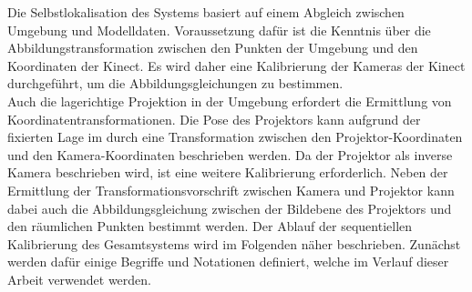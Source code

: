 Die Selbstlokalisation des Systems basiert auf einem Abgleich zwischen Umgebung und Modelldaten. Voraussetzung dafür ist die Kenntnis über die Abbildungstransformation zwischen den Punkten der Umgebung und den Koordinaten der Kinect. Es wird daher eine Kalibrierung der Kameras der Kinect durchgeführt, um die Abbildungsgleichungen zu bestimmen.\\

Auch die lagerichtige Projektion in der Umgebung erfordert die Ermittlung von Koordinatentransformationen. Die Pose des Projektors kann aufgrund der fixierten Lage im \kps{} durch eine Transformation zwischen den Projektor-Koordinaten und den Kamera-Koordinaten beschrieben werden. Da der Projektor als inverse Kamera beschrieben wird, ist eine weitere Kalibrierung erforderlich. Neben der Ermittlung der Transformationsvorschrift zwischen Kamera und Projektor kann dabei auch die Abbildungsgleichung zwischen der Bildebene des Projektors und den räumlichen Punkten bestimmt werden. Der Ablauf der sequentiellen Kalibrierung des Gesamtsystems wird im Folgenden näher beschrieben. Zunächst werden dafür einige Begriffe und Notationen definiert, welche im Verlauf dieser Arbeit verwendet werden.


